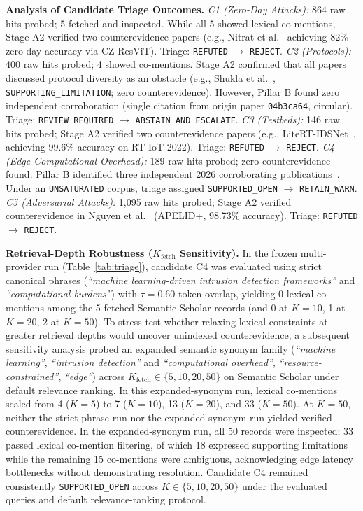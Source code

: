 \documentclass[runningheads]{llncs}
\begin{document}
\noindent\textbf{Analysis of Candidate Triage Outcomes.} \emph{C1 (Zero-Day Attacks):} 864 raw hits probed; 5 fetched and inspected. While all 5 showed lexical co-mentions, Stage A2 verified two counterevidence papers (e.g., Nitrat et al.~\cite{nitrat2025zeroday} achieving 82\% zero-day accuracy via CZ-ResViT). Triage: \texttt{REFUTED} $\rightarrow$ \texttt{REJECT}.
\emph{C2 (Protocols):} 400 raw hits probed; 4 showed co-mentions. Stage A2 confirmed that all papers discussed protocol diversity as an obstacle (e.g., Shukla et al.~\cite{shukla2025effective}, \texttt{SUPPORTING\_}\allowbreak\texttt{LIMITATION}; zero counterevidence). However, Pillar B found zero independent corroboration (single citation from origin paper \texttt{04b3ca64}, circular). Triage: \texttt{REVIEW\_}\allowbreak\texttt{REQUIRED} $\rightarrow$ \texttt{ABSTAIN\_}\allowbreak\texttt{AND\_}\allowbreak\texttt{ESCALATE}.
\emph{C3 (Testbeds):} 146 raw hits probed; Stage A2 verified two counterevidence papers (e.g., LiteRT-IDSNet~\cite{ogundokun2025litert}, achieving 99.6\% accuracy on RT-IoT 2022). Triage: \texttt{REFUTED} $\rightarrow$ \texttt{REJECT}.
\emph{C4 (Edge Computational Overhead):} 189 raw hits probed; zero counterevidence found. Pillar B identified three independent 2026 corroborating publications~\cite{jenish2026review,alam2026reservoir,mahdi2026scf}. Under an \texttt{UNSATURATED} corpus, triage assigned \texttt{SUPPORTED\_\allowbreak OPEN} $\rightarrow$ \texttt{RETAIN\_WARN}.
\emph{C5 (Adversarial Attacks):} 1,095 raw hits probed; Stage A2 verified counterevidence in Nguyen et al.~\cite{nguyen2025adversarial} (APELID+, 98.73\% accuracy). Triage: \texttt{REFUTED} $\rightarrow$ \texttt{REJECT}.

\noindent\textbf{Retrieval-Depth Robustness ($K_{\text{fetch}}$ Sensitivity).} In the frozen multi-provider run (Table~\ref{tab:triage}), candidate C4 was evaluated using strict canonical phrases (\emph{``machine learning-driven intrusion detection frameworks''} and \emph{``computational burdens''}) with $\tau=0.60$ token overlap, yielding 0 lexical co-mentions among the 5 fetched Semantic Scholar records (and 0 at $K=10$, 1 at $K=20$, 2 at $K=50$). To stress-test whether relaxing lexical constraints at greater retrieval depths would uncover unindexed counterevidence, a subsequent sensitivity analysis probed an expanded semantic synonym family (\emph{``machine learning''}, \emph{``intrusion detection''} and \emph{``computational overhead''}, \emph{``resource-constrained''}, \emph{``edge''}) across $K_{\text{fetch}} \in \{5, 10, 20, 50\}$ on Semantic Scholar under default relevance ranking. In this expanded-synonym run, lexical co-mentions scaled from 4 ($K=5$) to 7 ($K=10$), 13 ($K=20$), and 33 ($K=50$). At $K = 50$, neither the strict-phrase run nor the expanded-synonym run yielded verified counterevidence. In the expanded-synonym run, all 50 records were inspected; 33 passed lexical co-mention filtering, of which 18 expressed supporting limitations while the remaining 15 co-mentions were ambiguous, acknowledging edge latency bottlenecks without demonstrating resolution. Candidate C4 remained consistently \texttt{SUPPORTED\_OPEN} across $K \in \{5, 10, 20, 50\}$ under the evaluated queries and default relevance-ranking protocol.
\end{document}
